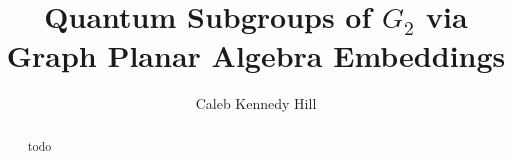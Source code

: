 \documentclass{amsart}
\title{Quantum Subgroups of $G_2$ via Graph Planar Algebra Embeddings}
\author{Caleb Kennedy Hill}
\date{}
\begin{document}
\maketitle

\begin{abstract}
    todo
\end{abstract}





% 




% 

% 

% 







\printbibliography
\end{document}
